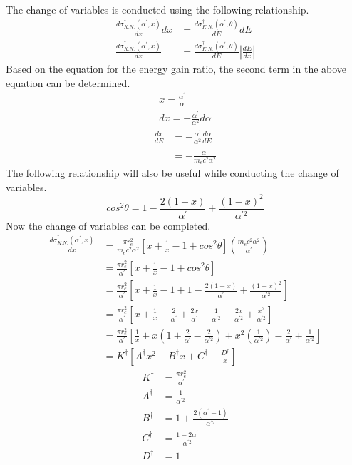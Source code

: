 The change of variables is conducted using the following relationship.
\begin{align}
  \frac{d\sigma_{K.N.}^{\dagger}(\alpha^{'},x)}{dx}dx & =
  \frac{d\sigma_{K.N.}^{\dagger}(\alpha^{'},\theta)}{dE}dE \nonumber \\
  \frac{d\sigma_{K.N.}^{\dagger}(\alpha^{'},x)}{dx} & = 
  \frac{d\sigma_{K.N.}^{\dagger}(\alpha^{'},\theta)}{dE} \left|\frac{dE}{dx}\right|
  \nonumber
\end{align}
Based on the equation for the energy gain ratio, the second term in the above
equation can be determined.
\begin{align}
  x = \frac{\alpha^{'}}{\alpha} \nonumber \\
  dx = -\frac{\alpha^{'}}{\alpha^2}d\alpha \nonumber
\end{align}
\begin{align}
  \frac{dx}{dE} & = -\frac{\alpha^{'}}{\alpha^2}\frac{d\alpha}{dE} \nonumber \\
  & = -\frac{\alpha^{'}}{m_ec^2\alpha^2}
\end{align}
The following relationship will also be useful while conducting the change
of variables.
\begin{equation}
  cos^2\theta = 1 - \frac{2(1-x)}{\alpha^{'}} + \frac{(1-x)^2}{\alpha^{'2}}
\end{equation}
Now the change of variables can be completed.
\begin{align}
  \frac{d\sigma_{K.N.}^{\dagger}(\alpha^{'},x)}{dx} & = 
  \frac{\pi r_e^2}{m_ec^2 \alpha^2}\left[x + \frac{1}{x} 
    - 1 + cos^2\theta \right] \left(\frac{m_ec^2\alpha^2}{\alpha^{'}}\right) 
  \nonumber \\
  & = \frac{\pi r_e^2}{\alpha^{'}} \left[x + \frac{1}{x} - 1 + cos^2\theta 
    \right] \\
  & = \frac{\pi r_e^2}{\alpha^{'}} \left[x + \frac{1}{x} - 1 + 1 - 
    \frac{2(1-x)}{\alpha^{'}} + \frac{(1-x)^2}{\alpha^{'2}} \right] \nonumber \\
  & = \frac{\pi r_e^2}{\alpha^{'}} \left[x + \frac{1}{x} - \frac{2}{\alpha^{'}} 
    + \frac{2x}{\alpha^{'}} + \frac{1}{\alpha^{'2}} - \frac{2x}{\alpha^{'2}} + 
    \frac{x^2}{\alpha^{'2}} \right] \nonumber \\
  & = \frac{\pi r_e^2}{\alpha^{'}} \left[\frac{1}{x} + 
    x\left(1 + \frac{2}{\alpha^{'}} - \frac{2}{\alpha^{'2}}\right) +
    x^2\left(\frac{1}{\alpha^{'2}}\right) - \frac{2}{\alpha^{'}} + 
    \frac{1}{\alpha^{'2}} \right] \nonumber \\
  & = K^{\dagger}\left[A^{\dagger}x^2 + B^{\dagger}x + C^{\dagger} + 
    \frac{D^{\dagger}}{x} \right]
\end{align}
\begin{align}
  K^{\dagger} & = \frac{\pi r_e^2}{\alpha^{'}} \nonumber \\
  A^{\dagger} & = \frac{1}{\alpha^{'2}} \nonumber \\
  B^{\dagger} & = 1 + \frac{2(\alpha^{'}-1)}{\alpha^{'2}} \nonumber \\
  C^{\dagger} & = \frac{1-2\alpha^{'}}{\alpha^{'2}} \nonumber \\
  D^{\dagger} & = 1 \nonumber
\end{align}
  
